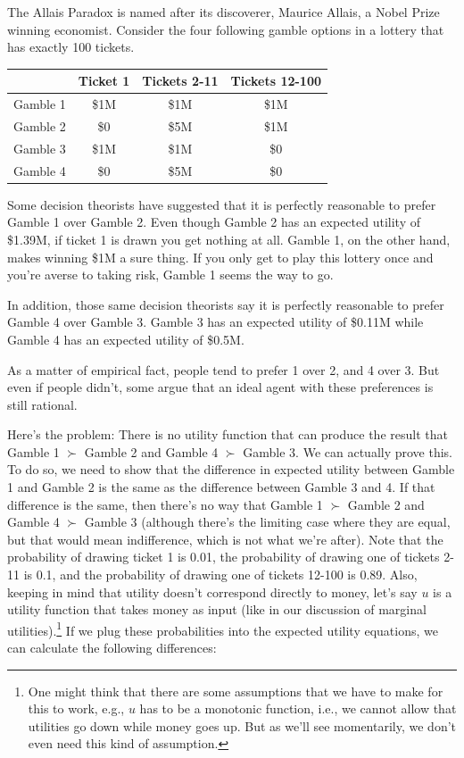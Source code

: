 \documentclass[]{tufte-book}
\begin{document}
The Allais Paradox is named after its discoverer, Maurice Allais, a Nobel Prize winning economist. Consider the four following gamble options in a lottery that has exactly 100 tickets.

\begin{longtable}[]{@{}lccc@{}}
\toprule
& Ticket 1 & Tickets 2-11 & Tickets 12-100\tabularnewline
\midrule
\endhead
Gamble 1 & \$1M & \$1M & \$1M\tabularnewline
Gamble 2 & \$0 & \$5M & \$1M\tabularnewline
Gamble 3 & \$1M & \$1M & \$0\tabularnewline
Gamble 4 & \$0 & \$5M & \$0\tabularnewline
\bottomrule
\end{longtable}

Some decision theorists have suggested that it is perfectly reasonable to prefer Gamble 1 over Gamble 2. Even though Gamble 2 has an expected utility of \$1.39M, if ticket 1 is drawn you get nothing at all. Gamble 1, on the other hand, makes winning \$1M a sure thing. If you only get to play this lottery once and you're averse to taking risk, Gamble 1 seems the way to go.

In addition, those same decision theorists say it is perfectly reasonable to prefer Gamble 4 over Gamble 3. Gamble 3 has an expected utility of \$0.11M while Gamble 4 has an expected utility of \$0.5M.

As a matter of empirical fact, people tend to prefer 1 over 2, and 4 over 3. But even if people didn't, some argue that an ideal agent with these preferences is still rational.

Here's the problem: There is no utility function that can produce the result that Gamble 1 \(\succ\) Gamble 2 and Gamble 4 \(\succ\) Gamble 3. We can actually prove this. To do so, we need to show that the difference in expected utility between Gamble 1 and Gamble 2 is the same as the difference between Gamble 3 and 4. If that difference is the same, then there's no way that Gamble 1 \(\succ\) Gamble 2 and Gamble 4 \(\succ\) Gamble 3 (although there's the limiting case where they are equal, but that would mean indifference, which is not what we're after). Note that the probability of drawing ticket 1 is 0.01, the probability of drawing one of tickets 2-11 is 0.1, and the probability of drawing one of tickets 12-100 is 0.89. Also, keeping in mind that utility doesn't correspond directly to money, let's say \(u\) is a utility function that takes money as input (like in our discussion of marginal utilities).\footnote{One might think that there are some assumptions that we have to make for this to work, e.g., $u$ has to be a monotonic function, i.e., we cannot allow that utilities go down while money goes up. But as we'll see momentarily, we don't even need this kind of assumption.} If we plug these probabilities into the expected utility equations, we can calculate the following differences:
\end{document}
